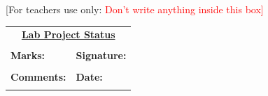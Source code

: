 \begin{titlepage}
\makeatother
{\large [For teachers use only: \textcolor{red}{Don’t write anything inside this box]}}\\

\begin{table}[]
\centering
\begin{tabular}{|p{7.5cm}p{7.0cm}|}
\hline
\multicolumn{2}{|c|}{{\underline{\textbf{Lab Project Status}}}} \\
 & \\\hline
\textbf{Marks:}                & \textbf{Signature:}        \\
 & \\ 
\textbf{Comments:}             & \textbf{Date:}             \\ 
 & \\\hline
\end{tabular}
\end{table}


\end{titlepage}

